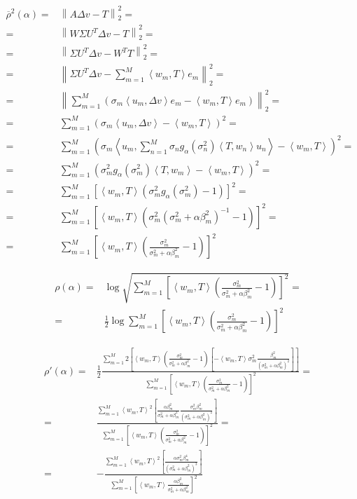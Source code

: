 \documentclass[a4paper,10pt]{article}
\theoremstyle{plain}
\theoremstyle{definition}
\theoremstyle{remark}
\newcommand{\obar}[1]{\overline{#1}}
\newcommand{\pa}[1]{\left(#1\right)}
\newcommand{\ang}[1]{\left<#1\right>}
\newcommand{\bra}[1]{\left[#1\right]}
\newcommand{\norm}[1]{\left\|#1\right\|}
\begin{document}
\begin{align*}
  \obar{\rho} ^2 (\alpha) =& \norm{ A \Delta v - T}_2 ^2 = \\
  =& \norm{ W \Sigma U ^T \Delta v - T}_2 ^2 = \\
  =& \norm{ \Sigma U ^T \Delta v - W^T T}_2 ^2 = \\
  = & \norm{ \Sigma U ^T \Delta v - \sum_{m=1} ^M \ang{w_m, T}e_m }_2
  ^2 = \\
  = & \norm{ \sum _{m=1} ^M \pa{ \sigma _m \ang{u_m, \Delta v} e_m -
      \ang{w_m, T}e_m } }_2 ^2 = \\
  = & \sum _{m=1} ^M \pa{ \sigma _m \ang{u_m, \Delta v} -
    \ang{w_m, T} } ^2 = \\
  = & \sum _{m=1} ^M \pa{ \sigma _m \ang{u_m , \sum _{n=1} ^M \sigma
      _n g_\alpha \pa{\sigma_n ^2 } \ang{T,w_n} u_n} - \ang{w_m, T} }
  ^2 = \\
  = & \sum _{m=1} ^M \pa{ \sigma _m ^2 g_\alpha \pa{\sigma_m ^2
    } \ang{T,w_m} - \ang{w_m, T} }^2 = \\
  = &\sum _{m=1} ^M \bra{ \ang{w_m, T} \pa{ \sigma _m ^2 g_\alpha
      \pa{\sigma_m ^2 } -1 }  } ^2 = \\
  = & \sum _{m=1} ^M \bra{ \ang{w_m, T} \pa{ \sigma _m ^2 \pa{ \sigma
        _m ^2 + \alpha \beta _m ^2 } ^ {-1}  - 1 } } ^2 = \\
  = & \sum _{m=1} ^M \bra{ \ang{w_m, T} \pa{ \frac{\sigma _m ^2}{
        \sigma _m ^2 + \alpha \beta _m ^2 } - 1 } } ^2
\end{align*}

\begin{align*}
  \rho (\alpha) = & \log \sqrt { \sum _{m=1} ^M \bra{ \ang{w_m, T} \pa{
        \frac{\sigma _m ^2}{ \sigma
          _m ^2 + \alpha \beta _m ^2 } - 1 } } ^2  } = \\
  = & \frac{1}{2} \log { \sum _{m=1} ^M \bra{ \ang{w_m, T} \pa{
        \frac{\sigma _m ^2}{ \sigma _m ^2 + \alpha \beta _m ^2 } - 1 }
    } ^2 }
\end{align*}

\begin{align*}
  \rho ' (\alpha) = & \frac{1}{2} \frac{\sum _{m=1} ^M 2
    \bra{\ang{w_m, T} \pa{ \frac{\sigma _m ^2}{ \sigma _m ^2 + \alpha
          \beta _m ^2 } - 1}\bra{- \ang{w_m, T} \sigma _m ^2
        \frac{\beta _m ^2}{\pa{\sigma _m ^2 + \alpha \beta_m ^2}^2} }
    }} { \sum _{m=1} ^M \bra{ \ang{w_m, T} \pa{ \frac{\sigma _m ^2}{
          \sigma
          _m ^2 + \alpha \beta _m ^2 } - 1 }  } ^2  } = \\
  = & \frac{\sum _{m=1} ^M \ang{w_m, T}^2 \bra{ \frac{\alpha \beta _m
        ^2}{ \sigma _m ^2 + \alpha \beta _m ^2 } \frac{ \sigma _m ^2
        \beta _m ^2}{\pa{\sigma _m ^2 + \alpha \beta_m ^2}^2} }} {
    \sum _{m=1} ^M \bra{ \ang{w_m, T} \pa{ \frac{\sigma _m ^2}{ \sigma
          _m ^2 + \alpha \beta _m ^2 } - 1 }  } ^2  } = \\
  = & - \frac{\sum _{m=1} ^M \ang{w_m, T}^2 \bra{ \frac{\alpha \sigma _m
        ^2 \beta _m ^4}{\pa{\sigma _m ^2 + \alpha \beta_m ^2}^3} }} {
    \sum _{m=1} ^M \bra{ \ang{w_m, T}  \frac{\alpha \beta _m ^2}{ \sigma
          _m ^2 + \alpha \beta _m ^2 }   } ^2  } \\
\end{align*}
\end{document}
